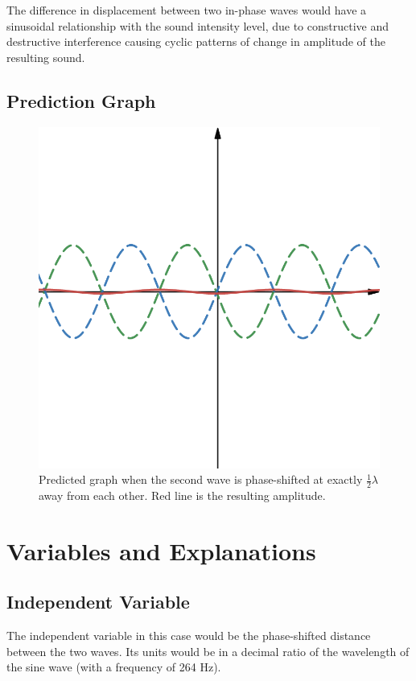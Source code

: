 \documentclass[index]{subfiles}
\begin{document}
The difference in displacement between two in-phase waves would have a sinusoidal relationship with the sound intensity level, due to constructive and destructive interference causing cyclic patterns of change in amplitude of the resulting sound.

\subsection{Prediction Graph}

\begin{figure}[H]
    \centering
    \includegraphics[scale=0.3]{prediction.png}
    \caption{Predicted graph when the second wave is phase-shifted at exactly \(\frac{1}{2}\lambda\) away from each other. Red line is the resulting amplitude.}
\end{figure}

\section{Variables and Explanations}

\subsection{Independent Variable}

The independent variable in this case would be the phase-shifted distance between the two waves. Its units would be in a decimal ratio of the wavelength of the sine wave (with a frequency of 264 Hz).
\end{document}
